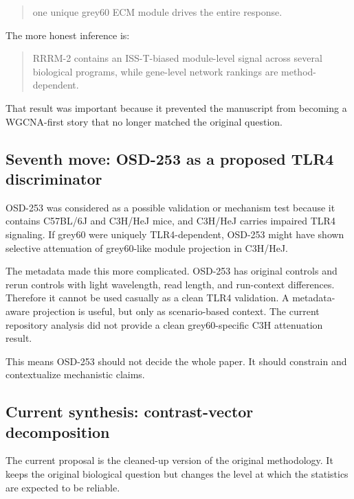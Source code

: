 \documentclass[11pt]{article}
\begin{document}
\begin{quote}
one unique grey60 ECM module drives the entire response.
\end{quote}

The more honest inference is:

\begin{quote}
RRRM-2 contains an ISS-T-biased module-level signal across several biological
programs, while gene-level network rankings are method-dependent.
\end{quote}

That result was important because it prevented the manuscript from becoming a
WGCNA-first story that no longer matched the original question.

\subsection{Seventh move: OSD-253 as a proposed TLR4 discriminator}

OSD-253 was considered as a possible validation or mechanism test because it
contains C57BL/6J and C3H/HeJ mice, and C3H/HeJ carries impaired TLR4 signaling.
If grey60 were uniquely TLR4-dependent, OSD-253 might have shown selective
attenuation of grey60-like module projection in C3H/HeJ.

The metadata made this more complicated. OSD-253 has original controls and rerun
controls with light wavelength, read length, and run-context differences.
Therefore it cannot be used casually as a clean TLR4 validation. A
metadata-aware projection is useful, but only as scenario-based context. The
current repository analysis did not provide a clean grey60-specific C3H
attenuation result.

This means OSD-253 should not decide the whole paper. It should constrain and
contextualize mechanistic claims.

\subsection{Current synthesis: contrast-vector decomposition}

The current proposal is the cleaned-up version of the original methodology. It
keeps the original biological question but changes the level at which the
statistics are expected to be reliable.
\end{document}
